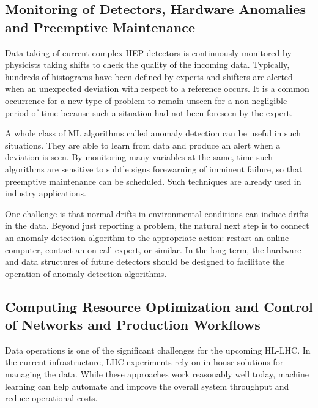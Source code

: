 \subsection{Monitoring of Detectors, Hardware Anomalies and Preemptive Maintenance}\label{sec:applications-monitoring}
Data-taking of current complex HEP detectors is continuously monitored by physicists taking shifts to check the quality of the incoming data. Typically, hundreds of histograms have been defined by experts and shifters are alerted when an unexpected deviation with respect to a reference occurs. It is a common occurrence for a new type of problem to remain unseen for a non-negligible period of time because such a situation had not been foreseen by the expert.

A whole class of ML algorithms called anomaly detection can be useful in such situations. They are able to learn from data and produce an alert when a deviation is seen. By monitoring many variables at the same, time such algorithms are sensitive to subtle signs forewarning of imminent failure, so that preemptive maintenance can be scheduled. Such techniques are already used in industry applications.

One challenge is that normal drifts in environmental conditions can induce drifts in the data. Beyond just reporting a problem, the natural next step is to connect an anomaly detection algorithm to the appropriate action: restart an online computer, contact an on-call expert, or similar. In the long term, the hardware and data structures of future detectors should be designed to facilitate the operation of anomaly detection algorithms.

\subsection{Computing Resource Optimization and Control of Networks and Production Workflows}\label{sec:resource-optimization}

Data operations is one of the significant challenges for the upcoming HL-LHC. In the current infrastructure, LHC experiments rely on in-house solutions for managing the data. While these approaches work reasonably well today, machine learning can help automate and improve the overall system throughput and reduce operational costs.

